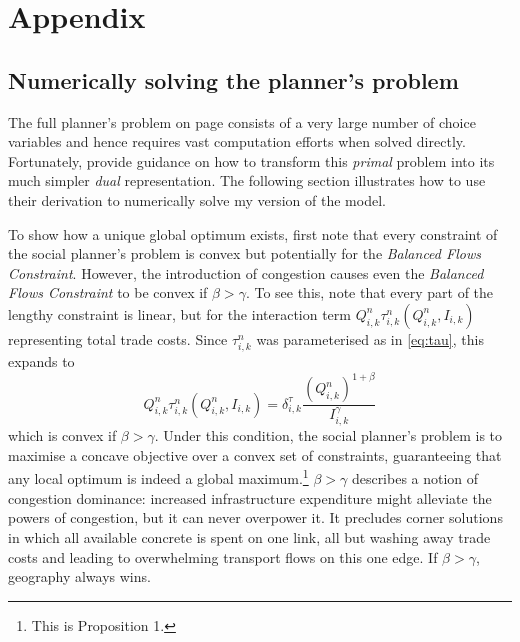 \documentclass[11pt, oneside]{article}   	%
\begin{document}
\section*{Appendix}
\begin{spacing}{1.3}
  \subsection{Numerically solving the planner's problem}
  \label{chapter:APP:math}


The full planner's problem on page \pageref{planner_problem} consists of a very large number of choice variables and hence requires vast computation efforts when solved directly. Fortunately, \cite{Fajgelbaum_OptimalTransportNetworks_2017} provide guidance on how to transform this \emph{primal} problem into its much simpler \emph{dual} representation. The following section illustrates how to use their derivation to numerically solve my version of the model.

To show how a unique global optimum exists, first note that every constraint of the social planner's problem is convex but potentially for the \emph{Balanced Flows Constraint}. However, the introduction of congestion causes even the \emph{Balanced Flows Constraint} to be convex if $\beta > \gamma$. To see this, note that every part of the lengthy constraint is linear, but for the interaction term $Q_{i,k}^{n}\tau_{i,k}^{n}(Q_{i,k}^{n}, I_{i,k})$ representing total trade costs. Since $\tau_{i,k}^{n}$ was parameterised as in \eqref{eq:tau}, this expands to
\begin{equation}
  Q_{i,k}^{n}\tau_{i,k}^{n}(Q_{i,k}^{n}, I_{i,k}) = \delta^{\tau}_{i,k} \frac{(Q_{i,k}^{n})^{1+\beta}}{I_{i,k}^{\gamma}}
\end{equation}
which is convex if $\beta > \gamma$. Under this condition, the social planner's problem is to maximise a concave objective over a convex set of constraints, guaranteeing that any local optimum is indeed a global maximum.\footnote{This is \citeauthor{Fajgelbaum_OptimalTransportNetworks_2017} Proposition 1.} $\beta > \gamma$ describes a notion of congestion dominance: increased infrastructure expenditure might alleviate the powers of congestion, but it can never overpower it. It precludes corner solutions in which all available concrete is spent on one link, all but washing away trade costs and leading to overwhelming transport flows on this one edge. If $\beta > \gamma$, geography always wins.


\end{spacing}
\end{document}
